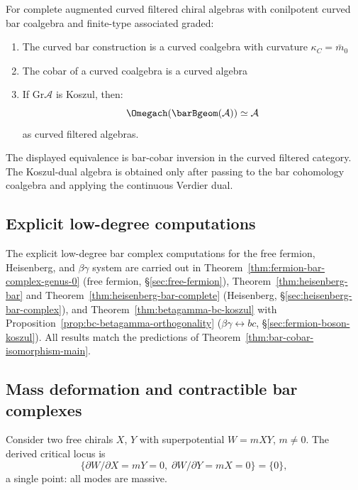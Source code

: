 \begin{theorem}
\label{thm:curved-koszul-duality}
For complete augmented curved filtered chiral algebras with
conilpotent curved bar coalgebra and finite-type associated graded:
\begin{enumerate}
\item The curved bar construction is a curved coalgebra with curvature $\kappa_C = \bar{m}_0$
\item The cobar of a curved coalgebra is a curved algebra
\item If $\text{Gr}\mathcal{A}$ is Koszul, then:
\[\Omegach(\barBgeom(\mathcal{A})) \simeq \mathcal{A}\]
as curved filtered algebras.
\end{enumerate}
The displayed equivalence is bar-cobar inversion in the curved
filtered category. The Koszul-dual algebra is obtained only after
passing to the bar cohomology coalgebra and applying the continuous
Verdier dual.
\end{theorem}


\subsection{Explicit low-degree computations}
\label{sec:explicit-low-degree}

The explicit low-degree bar complex computations for the free fermion, Heisenberg, and $\beta\gamma$ system are carried out in Theorem~\ref{thm:fermion-bar-complex-genus-0} (free fermion, \S\ref{sec:free-fermion}), Theorem~\ref{thm:heisenberg-bar} and Theorem~\ref{thm:heisenberg-bar-complete} (Heisenberg, \S\ref{sec:heisenberg-bar-complex}), and Theorem~\ref{thm:betagamma-bc-koszul} with Proposition~\ref{prop:bc-betagamma-orthogonality} ($\beta\gamma \leftrightarrow bc$, \S\ref{sec:fermion-boson-koszul}). All results match the predictions of Theorem~\ref{thm:bar-cobar-isomorphism-main}.


\subsection{Mass deformation and contractible bar complexes}
\label{subsec:massive-chiral-contractible}

Consider two free chirals $X$, $Y$ with superpotential $W = mXY$,
$m \neq 0$. The derived critical locus is
\[
\bigl\{ \partial W/\partial X = mY = 0,\;
 \partial W/\partial Y = mX = 0 \bigr\} = \{0\},
\]
a single point: all modes are massive.

